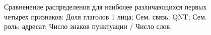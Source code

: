 \documentclass[12pt]{article}
\begin{document}
\begin{figure}[ht!]  
\vspace{-4ex} \centering {}  
\hspace{2ex}
\vspace{2ex} \centering {}  
\hspace{2ex}
\caption{Сравненение распределения для наиболее различающихся первых четырех признаков:  Доля глаголов 1 лица;  Сем. связь: QNT;  Сем. роль: адресат;  Число знаков пунктуации / Число слов.} \label{hist2}
\end{figure}
\end{document}
